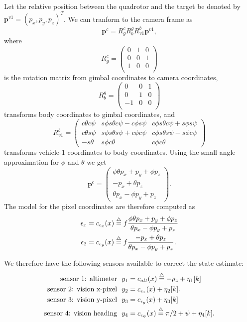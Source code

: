 {Let the relative position between the quadrotor and the target be
denoted by $\mathbf{p}^{v1} = (p_x, p_y, p_z)^T$.  We can tranform
to the camera frame as
\[
\mathbf{p}^c = R_g^c R_b^g R_{v1}^b \mathbf{p}^{v1},
\]
where
\[
R_g^c = \begin{pmatrix}
    0 & 1 & 0 \\
    0 & 0 & 1 \\
    1 & 0 & 0 \\
\end{pmatrix}
\]
is the rotation matrix from gimbal coordinates to camera
coordinates,
\[
R_b^g = \begin{pmatrix}
    0 & 0 & 1 \\
    0 & 1 & 0 \\
    -1 & 0 & 0 \\
\end{pmatrix}
\]
transforms body coordinates to gimbal coordinates, and
\[
R_{v1}^b = \begin{pmatrix}
    c\theta c\psi & s\phi s\theta c\psi - c\phi s\psi
    & c\phi s\theta c\psi + s\phi s\psi \\
    c\theta s\psi &  s\phi s\theta s\psi + c\phi c\psi
    & c\phi s\theta s\psi - s\phi c\psi  \\
    -s\theta & s\phi c\theta & c\phi c\theta
\end{pmatrix}
\]
transforms vehicle-1 coordinates to body coordinates. Using the
small angle approximation for $\phi$ and $\theta$ we get
\[
\mathbf{p}^c = \begin{pmatrix}
    \phi\theta p_x + p_y + \phi p_z \\
    -p_x + \theta p_z \\
    \theta p_x - \phi p_y + p_z
\end{pmatrix}.
\]
The model for the pixel coordinates are therefore computed as
\begin{align*}
\epsilon_x &= c_{\epsilon_x}(x) \stackrel{\triangle}{=} f\frac{\phi\theta p_x + p_y +
\phi
p_z}{\theta p_x -\phi p_y + p_z} \\
\epsilon_2 &= c_{\epsilon_y}(x) \stackrel{\triangle}{=} f\frac{-p_x + \theta
p_z}{\theta p_x - \phi p_y + p_z}.
\end{align*}

We therefore have the following sensors available to correct the
state estimate:
\begin{align}
\text{sensor 1: altimeter~~} & y_1 = c_{alt}(x) \stackrel{\triangle}{=} -p_z + \eta_1[k] \\
\text{sensor 2: vision x-pixel~~} & y_2 = c_{\epsilon_x}(x) + \eta_2[k]. \\
\text{sensor 3: vision y-pixel~~} & y_3 = c_{\epsilon_y}(x) + \eta_3[k] \\
\text{sensor 4: vision heading~~} & y_4 = c_{\epsilon_{\psi}}(x)
\stackrel{\triangle}{=} \pi/2 + \psi + \eta_4[k].
\end{align}

}
